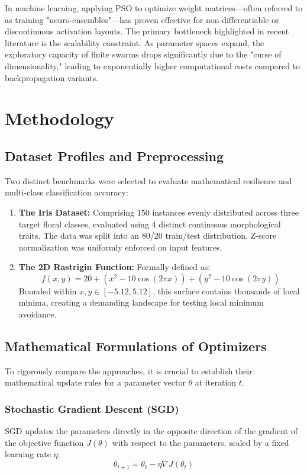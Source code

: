 \documentclass[12pt, a4paper]{article}
\begin{document}
In machine learning, applying PSO to optimize weight matrices—often referred to as training "neuro-ensembles"—has proven effective for non-differentiable or discontinuous activation layouts. The primary bottleneck highlighted in recent literature is the scalability constraint. As parameter spaces expand, the exploratory capacity of finite swarms drops significantly due to the "curse of dimensionality," leading to exponentially higher computational costs compared to backpropagation variants.

\section{Methodology}

\subsection{Dataset Profiles and Preprocessing}
Two distinct benchmarks were selected to evaluate mathematical resilience and multi-class classification accuracy:
\begin{enumerate}
    \item \textbf{The Iris Dataset:} Comprising 150 instances evenly distributed across three target floral classes, evaluated using 4 distinct continuous morphological traits. The data was split into an 80/20 train/test distribution. Z-score normalization was uniformly enforced on input features.
    \item \textbf{The 2D Rastrigin Function:} Formally defined as:
    \begin{equation}
        f(x, y) = 20 + (x^2 - 10\cos(2\pi x)) + (y^2 - 10\cos(2\pi y))
    \end{equation}
    Bounded within $x, y \in [-5.12, 5.12]$, this surface contains thousands of local minima, creating a demanding landscape for testing local minimum avoidance.
\end{enumerate}

\subsection{Mathematical Formulations of Optimizers}

To rigorously compare the approaches, it is crucial to establish their mathematical update rules for a parameter vector $\theta$ at iteration $t$.

\subsubsection{Stochastic Gradient Descent (SGD)}
SGD updates the parameters directly in the opposite direction of the gradient of the objective function $J(\theta)$ with respect to the parameters, scaled by a fixed learning rate $\eta$:
\begin{equation}
    \theta_{t+1} = \theta_t - \eta \nabla J(\theta_t)
\end{equation}
\end{document}
